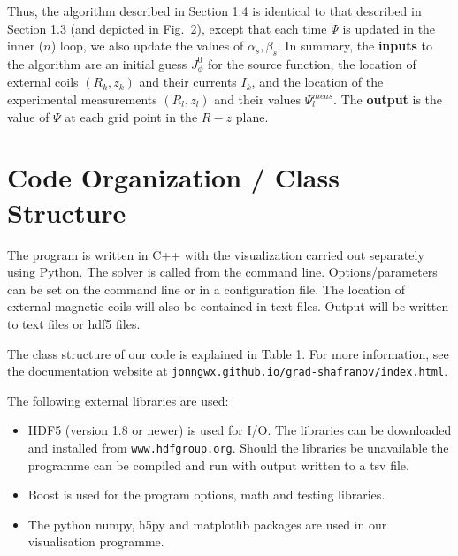 \documentclass[paper=letter, fontsize=11pt]{scrartcl} %
\begin{document}
Thus, the algorithm described in Section 1.4 is identical to that described in Section 1.3 (and depicted in Fig.~2), except that each time $\Psi$ is updated in the inner ($n$) loop, we also update the values of $\alpha_s, \beta_s$.  In summary, the \textbf{inputs} to the algorithm are an initial guess $J_\phi^0$ for the source function, the location of external coils $(R_k,z_k)$ and their currents $I_k$, and the location of the experimental measurements $(R_l,z_l)$ and their values $\Psi_l^{meas}$.  The \textbf{output} is the value of $\Psi$ at each grid point in the $R-z$ plane.  




\section{Code Organization / Class Structure}

The program is written in C++ with the visualization carried out separately using Python. The solver is called from the command line.  Options/parameters can be set on the command line or in a configuration file.  The location of external magnetic coils will also be contained in text files. Output will be written to text files or hdf5 files. 

The class structure of our code is explained in Table 1.  For more information, see the documentation website at \href{http://jonngwx.github.io/grad-shafranov/index.html}{\nolinkurl{jonngwx.github.io/grad-shafranov/index.html}}.

The following external libraries are used:
\begin{itemize}
\item HDF5 (version 1.8 or newer) is used for I/O. The libraries can be downloaded and installed from \texttt{www.hdfgroup.org}. Should the libraries be unavailable the programme can be compiled and run with output written to a tsv file. 
\item Boost is used for the program options, math and testing libraries. 
\item The python numpy, h5py and matplotlib packages are used in our visualisation programme. 
\end{itemize}
\end{document}
